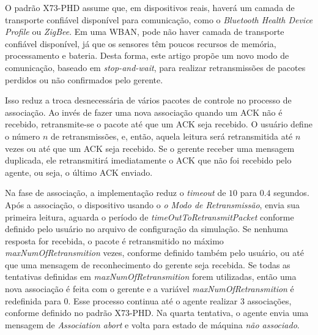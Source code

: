 O padrão X73-PHD assume que, em dispositivos reais, haverá um camada de transporte confiável disponível para comunicação, como  o \textit{Bluetooth Health Device Profile} ou \textit{ZigBee}. Em uma WBAN, pode não haver camada de transporte confiável disponível, já que os sensores têm poucos recursos de memória, processamento e bateria. Desta forma, este artigo propõe um novo modo de comunicação, baseado em \textit{stop-and-wait}, para realizar retransmissões de pacotes perdidos ou não confirmados pelo gerente.

Isso reduz a troca desnecessária de vários pacotes de controle no processo de associação. Ao invés de fazer uma nova associação quando um ACK não é recebido, retransmite-se o pacote até que um ACK seja recebido. O usuário define o número $n$ de retransmissões, e, então, aquela leitura será retransmitida até $n$ vezes ou até que um ACK seja recebido. Se o gerente receber uma mensagem duplicada, ele retransmitirá imediatamente o ACK que não foi recebido pelo agente, ou seja, o último ACK enviado.

Na fase de associação, a implementação reduz o \textit{timeout} de $10$ para $0.4$ segundos. Após a associação, o dispositivo usando o \textit{o Modo de Retransmissão}, envia sua primeira leitura, aguarda o período de \textit{timeOutToRetransmitPacket} conforme definido pelo usuário no arquivo de configuração da simulação. Se nenhuma resposta for recebida, o pacote é retransmitido no máximo \textit{maxNumOfRetransmition} vezes, conforme definido também pelo usuário, ou até que uma mensagem de reconhecimento do gerente seja recebida. Se todas as tentativas definidas em \textit{maxNumOfRetransmition} forem utilizadas, então uma nova associação é feita com o gerente e a variável \textit{maxNumOfRetransmition} é redefinida para $0$. Esse processo continua até o agente realizar $3$ associações, conforme definido no padrão X73-PHD. Na quarta tentativa, o agente envia uma mensagem de \textit{Association abort} e volta para estado de máquina \textit{não associado}. 

